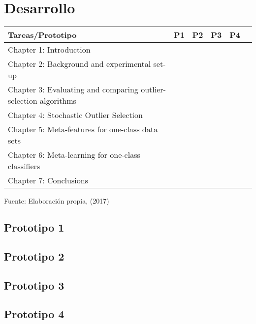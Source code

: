 \section{Desarrollo}

\begin{table}[H]
\centering
{}
\begin{tabular}{lccccc}\toprule
Tareas/Prototipo&P1&P2&P3&P4\\
\midrule
\rowcolor[gray]{0.9}
Chapter 1: Introduction 											& \y & \y & \y & \y \\
Chapter 2: Background and experimental set-up 						&    & \y & \y & \y \\
\rowcolor[gray]{0.9}
Chapter 3: Evaluating and comparing outlier-selection algorithms 	&    & \y &    &    \\
Chapter 4: Stochastic Outlier Selection 							&    &    & \y &    \\
\rowcolor[gray]{0.9}
Chapter 5: Meta-features for one-class data sets 					&    &    &    & \y \\
Chapter 6: Meta-learning for one-class classifiers 					&    &    &    & \y \\
\rowcolor[gray]{0.9}
Chapter 7: Conclusions  											& \y & \y & \y & \y \\
\bottomrule
\end{tabular}
\medskip
\par\centering Fuente: Elaboración propia, (2017)
\end{table}


\subsection{Prototipo 1}

\subsection{Prototipo 2}

\subsection{Prototipo 3}

\subsection{Prototipo 4}